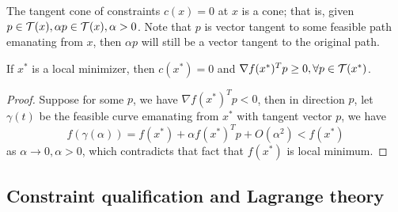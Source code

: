 \begin{refsection}
\begin{remark}
The tangent cone of constraints $c(x)=0$ at $x$ is a cone; that is, given $p\in \mathcal{T}(x), \alpha p\in \mathcal{T}(x), \alpha > 0$.
Note that $p$ is vector tangent to some feasible path emanating from $x$, then $\alpha p$ will still be a vector tangent to the original path.
\end{remark}

\begin{theorem}\label{ch:constrained-nonlinear-optimization:th:firstordernecessaryconditiongeoemtricformequalityconstraint}
\cite[lec 4]{Robinson2015nonlinear2}If $x^*$ is a local minimizer, then $c(x^*) = 0$ and $\nabla f(x^*)^T p \geq 0, \forall p\in \mathcal{T}(x^*)$. 
\end{theorem}
\begin{proof}
Suppose for some $p$, we have $\nabla f(x^*)^T p < 0$, then in direction $p$, let $\gamma(t)$ be the feasible curve emanating from $x^*$ with tangent vector $p$, we have
$$f(\gamma(\alpha)) = f(x^*) + \alpha f(x^*)^T p + O(\alpha^2) < f(x^*)$$
as $\alpha \to 0,\alpha > 0$, which contradicts that fact that $f(x^*)$ is local minimum.
\end{proof}


\subsection{Constraint qualification and Lagrange theory}



\end{refsection}
